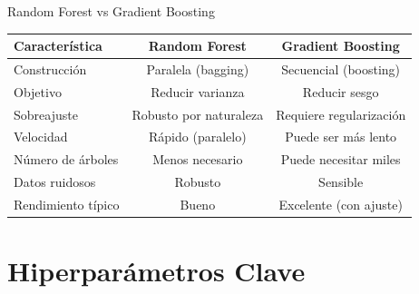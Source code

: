 \documentclass[aspectratio=169, 10pt, xcolor=table]{beamer}
\begin{document}
\begin{frame}{Random Forest vs Gradient Boosting}
    \begin{table}
        \centering
        \begin{tabular}{l|c|c}
            \toprule
            \textbf{Característica} & \textbf{Random Forest} & \textbf{Gradient Boosting} \\
            \midrule
            Construcción & Paralela (bagging) & Secuencial (boosting) \\
            Objetivo & Reducir varianza & Reducir sesgo \\
            Sobreajuste & Robusto por naturaleza & Requiere regularización \\
            Velocidad & Rápido (paralelo) & Puede ser más lento \\
            Número de árboles & Menos necesario & Puede necesitar miles \\
            Datos ruidosos & Robusto & Sensible \\
            Rendimiento típico & Bueno & Excelente (con ajuste) \\
            \bottomrule
        \end{tabular}
    \end{table}
\end{frame}

\section{Hiperparámetros Clave}
\end{document}
